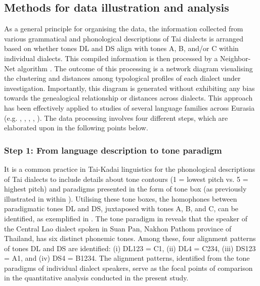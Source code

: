 \documentclass[output=paper]{langscibook}
\begin{document}
\subsection{Methods for data illustration and analysis}
\label{sec:yurayong:3.2}
As a general principle for organising the data, the information collected from various grammatical and phonological descriptions of Tai dialects is arranged based on whether tones DL and DS align with tones A, B, and/or C within individual dialects. This compiled information is then processed by a Neighbor-Net algorithm \citep{BryantMoulton2004}. The outcome of this processing is a network diagram visualising the clustering and distances among typological profiles of each dialect under investigation. Importantly, this diagram is generated without exhibiting any bias towards the genealogical relationship or distances across dialects. This approach has been effectively applied to studies of several language families across Eurasia (e.g. \citealt{GrünthalNichols2016}, \citealt{SzetoEtAl2018}, \citealt{Nichols2020}, \citealt{YurayongSzeto2020}, \citealt{SzetoYurayong2021}). The data processing involves four different steps, which are elaborated upon in the following points below.

\subsubsection{Step 1: From language description to tone paradigm}\label{sec:yurayong:3.2.1}

It is a common practice in Tai-Kadai linguistics for the phonological descriptions of Tai dialects to include details about tone contours (1 = lowest pitch vs. 5 = highest pitch) and paradigms presented in the form of tone box (as previously illustrated in  within ). Utilising these tone boxes, the homophones between paradigmatic tones DL and DS, juxtaposed with tones A, B, and C, can be identified, as exemplified in . The tone paradigm in  reveals that the speaker of the Central Lao dialect spoken in Suan Pan, Nakhon Pathom province of Thailand, has six distinct phonemic tones. Among these, four alignment patterns of tones DL and DS are identified: (i) DL123 = C1, (ii) DL4 = C234, (iii) DS123 = A1, and (iv) DS4 = B1234. The alignment patterns, identified from the tone paradigms of individual dialect speakers, serve as the focal points of comparison in the quantitative analysis conducted in the present study.
\end{document}
